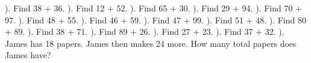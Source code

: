 \documentclass{article}%
\begin{document}
\newline%
\newline%
). Find 38 + 36.%
\newline%
\newline%
). Find 12 + 52.%
\newline%
\newline%
). Find 65 + 30.%
\newline%
\newline%
). Find 29 + 94.%
\newline%
\newline%
). Find 70 + 97.%
\newline%
\newline%
). Find 48 + 55.%
\newline%
\newline%
). Find 46 + 59.%
\newline%
\newline%
). Find 47 + 99.%
\newline%
\newline%
). Find 51 + 48.%
\newline%
\newline%
). Find 80 + 89.%
\newline%
\newline%
). Find 38 + 71.%
\newline%
\newline%
). Find 89 + 26.%
\newline%
\newline%
). Find 27 + 23.%
\newline%
\newline%
). Find 37 + 32.%
\newline%
\newline%
). James has 18 papers. James then makes 24 more. How many total papers does James have?%
\end{document}
